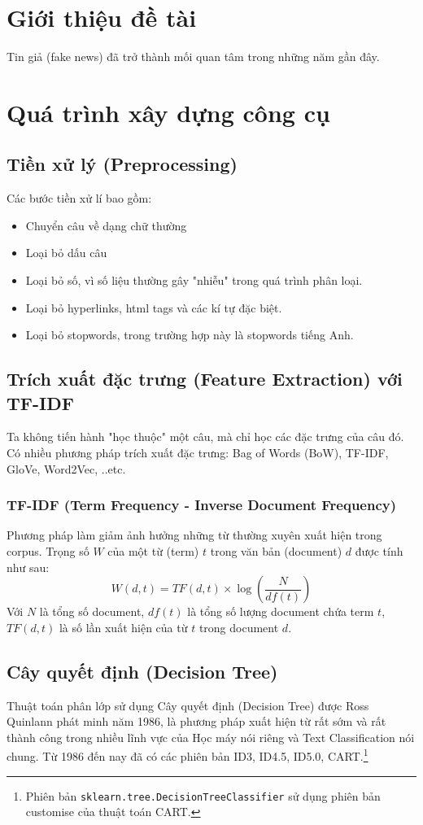 \documentclass[12pt]{article}
\begin{document}
\begin{titlepage}
\vfill
\end{titlepage}
	
	
\tableofcontents
\pagebreak

\section{Giới thiệu đề tài}
Tin giả (fake news) đã trở thành mối quan tâm trong những năm gần đây.

\section{Quá trình xây dựng công cụ}
\subsection{Tiền xử lý (Preprocessing)}
Các bước tiền xử lí bao gồm:
\begin{itemize}
\item Chuyển câu về dạng chữ thường
\item Loại bỏ dấu câu
\item Loại bỏ số, vì số liệu thường gây "nhiễu" trong quá trình phân loại.
\item Loại bỏ hyperlinks, html tags và các kí tự đặc biệt.
\item Loại bỏ stopwords, trong trường hợp này là stopwords tiếng Anh.
\end{itemize}

\subsection{Trích xuất đặc trưng (Feature Extraction) với TF-IDF}
Ta không tiến hành "học thuộc" một câu, mà chỉ học các đặc trưng của câu đó. Có nhiều phương pháp trích xuất đặc trưng: Bag of Words (BoW), TF-IDF, GloVe, Word2Vec, ..etc.

\subsubsection{TF-IDF (Term Frequency - Inverse Document Frequency)}
Phương pháp làm giảm ảnh hưởng những từ thường xuyên xuất hiện trong corpus. Trọng số $W$ của một từ (term) $t$ trong văn bản (document) $d$ được tính như sau:
$$
W(d, t) = TF(d, t) \times \log\left(\frac{N}{df(t)}\right)
$$
Với $N$ là tổng số document, $df(t)$ là tổng số lượng document chứa term $t$, $TF(d, t)$ là số lần xuất hiện của từ $t$ trong document $d$.

\subsection{Cây quyết định (Decision Tree)}
Thuật toán phân lớp sử dụng Cây quyết định (Decision Tree) được Ross Quinlann phát minh năm 1986\cite{DBLP:journals/ml/Quinlan86}, là phương pháp xuất hiện từ rất sớm và rất thành công trong nhiều lĩnh vực của Học máy nói riêng và Text Classification nói chung. Từ 1986 đến nay đã có các phiên bản ID3, ID4.5, ID5.0, CART.\footnote{Phiên bản \texttt{sklearn.tree.DecisionTreeClassifier} sử dụng phiên bản customise của thuật toán CART.\cite{scikit-learn}}
\end{document}
